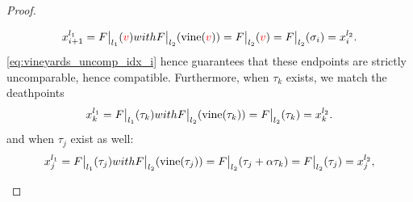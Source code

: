 \documentclass{article}
\newcommand{\vine}{\mathrm{vine}}
\newcommand\restr[2]{{  \left.\kern-\nulldelimiterspace #1 \vphantom{\big|} \right|_{#2}  }}
\begin{document}
\begin{proof}
\begin{enumerate}
\begin{enumerate}
\begin{enumerate}
\begin{equation*}
								x_{i+1}^{l_1} = \restr F {l_1} (\v) \textnormal{ with }
								\restr F {l_2}(\vine(\v)) =
								\restr F {l_2}(\v )  = \restr F {l_2} (\sigma_i) = x_{i}^{l_2}.
							\end{equation*}
							\cref{eq:vineyards_uncomp_idx_i} hence guarantees that these endpoints are strictly uncomparable, hence compatible.
							Furthermore, when $\tau_k$ exists, we match the deathpoints
							\begin{equation*}
								x_{k}^{l_1} = \restr F {l_1} (\tau_k) \textnormal{ with }
								\restr F {l_2}(\vine(\tau_k)) =
								\restr F {l_2}(\tau_k ) = x_{k}^{l_2}.
							\end{equation*}
							and when $\tau_j$ exist as well:
							\begin{equation*}
								x_{j}^{l_1} = \restr F {l_1} (\tau_j) \textnormal{ with }
								\restr F {l_2}(\vine(\tau_j)) =
								\restr F {l_2}(\tau_j + \alpha\tau_k )  = \restr F {l_2} (\tau_j) = x_{j}^{l_2},
							\end{equation*}


\end{enumerate}
\end{enumerate}
\end{enumerate}
\end{proof}
\end{document}

